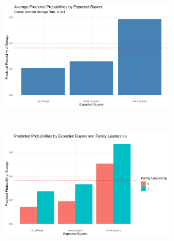 \begin{figure}[htbp]
    \centering
    \begin{subfigure}{\textwidth}
        \centering
        \includegraphics[height=0.28\textheight]{figures/overall_predicted_probs.png}
        \caption{}
    \end{subfigure}\\[2mm]
    
    \begin{subfigure}{\textwidth}
        \centering
        \includegraphics[height=0.28\textheight]{figures/predicted_probs_by_family.png}
        \caption{}
    \end{subfigure}\\[2mm]


\end{figure}
